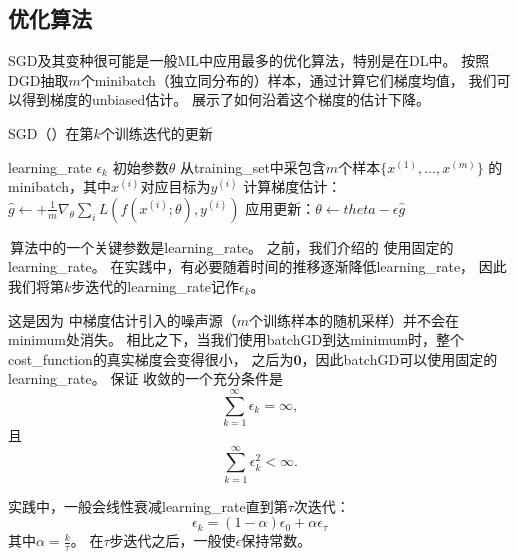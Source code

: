 \subsection{优化算法}
\label{sec:stochastic_gradient_descent_chap8}
\gls{SGD}及其变种很可能是一般\gls{ML}中应用最多的优化算法，特别是在\gls{DL}中。
按照\gls{DGD}抽取$m$个\gls{minibatch}（独立同分布的）样本，通过计算它们梯度均值，
我们可以得到梯度的\gls{unbiased}估计。
展示了如何沿着这个梯度的估计下降。

\begin{algorithm}[ht]
	\caption{\gls{SGD}（）在第$k$个训练迭代的更新}
	\label{alg:sgd}
	\begin{algorithmic}
		\REQUIRE \gls{learning_rate} $\epsilon_k$
		\REQUIRE 初始参数$\theta$
		\STATE 从\gls{training_set}中采包含$m$个样本$\{ x^{(1)},\dots, x^{(m)}\}$ 的\gls{minibatch}，其中$x^{(i)}$对应目标为$y^{(i)}$
		\STATE 计算梯度估计： $\hat{g} \leftarrow + 
		\frac{1}{m} \nabla_{\theta} \sum_i L(f(x^{(i)};\theta),y^{(i)})$
		\STATE 应用更新：$\theta \leftarrow theta - \epsilon \hat{g}$
		\ENDWHILE
	\end{algorithmic}
\end{algorithm}

\,算法中的一个关键参数是\gls{learning_rate}。
之前，我们介绍的\,\,使用固定的\gls{learning_rate}。
在实践中，有必要随着时间的推移逐渐降低\gls{learning_rate}，
因此我们将第$k$步迭代的\gls{learning_rate}记作$\epsilon_k$。

这是因为\,\,中梯度估计引入的噪声源（$m$个训练样本的随机采样）并不会在\gls{minimum}处消失。
相比之下，当我们使用\gls{batch}\gls{GD}到达\gls{minimum}时，整个\gls{cost_function}的真实梯度会变得很小，
之后为$\mathbf{0}$，因此\gls{batch}\gls{GD}可以使用固定的\gls{learning_rate}。
保证\,\,收敛的一个充分条件是
\begin{equation}
\label{eq:8.12}
\sum_{k=1}^\infty \epsilon_k = \infty,
\end{equation}
且
\begin{equation}
\label{eq:8.13}
\sum_{k=1}^\infty \epsilon_k^2 < \infty.
\end{equation}

实践中，一般会线性衰减\gls{learning_rate}直到第$\tau$次迭代：
\begin{equation}
\label{eq:8.14}
\epsilon_k = (1-\alpha) \epsilon_0 + \alpha \epsilon_\tau
\end{equation}
其中$\alpha = \frac{k}{\tau}$。
在$\tau$步迭代之后，一般使$\epsilon$保持常数。

